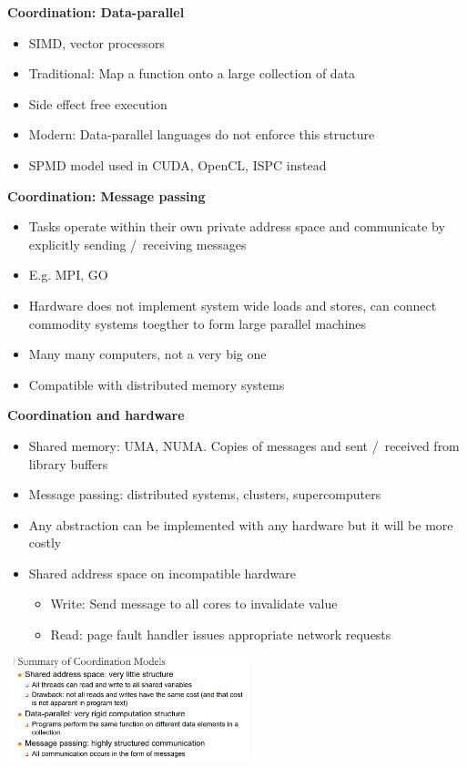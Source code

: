 \documentclass[10pt, landscape]{article}
\begin{document}
\begin{multicols}{4}
\textbf{Coordination: Data-parallel}
\begin{itemize}
    \item SIMD, vector processors 
    \item Traditional: Map a function onto a large collection of data 
    \item Side effect free execution
    \item Modern: Data-parallel languages do not enforce this structure 
    \item SPMD model used in CUDA, OpenCL, ISPC instead
\end{itemize}

\textbf{Coordination: Message passing}
\begin{itemize}
    \item Tasks operate within their own private address space and communicate by explicitly sending /\ receiving messages 
    \item E.g. MPI, GO 
    \item Hardware does not implement system wide loads and stores, can connect commodity systems toegther to form large parallel machines 
    \item Many many computers, not a very big one
    \item Compatible with distributed memory systems 
\end{itemize}

\textbf{Coordination and hardware}
\begin{itemize}
    \item Shared memory: UMA, NUMA. Copies of messages and sent /\ received from library buffers
    \item Message passing: distributed systems, clusters, supercomputers
    \item Any abstraction can be implemented with any hardware but it will be more costly
    \item Shared address space on incompatible hardware
    \begin{itemize}
        \item Write: Send message to all cores to invalidate value 
        \item Read: page fault handler issues appropriate network requests
    \end{itemize}
\end{itemize}

\includegraphics*[width=7cm]{coordination_model}




\end{multicols}
\end{document}
